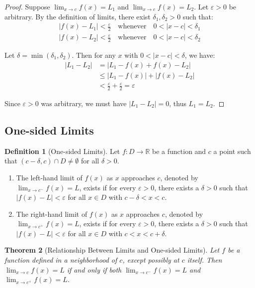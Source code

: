 \documentclass[12pt,a4paper]{article}
\theoremstyle{plain}
\newtheorem{theorem}{Theorem}[section]
\theoremstyle{definition}
\newtheorem{definition}[theorem]{Definition}
\begin{document}
\begin{proof}
Suppose $\lim_{x \to c} f(x) = L_1$ and $\lim_{x \to c} f(x) = L_2$. Let $\varepsilon > 0$ be arbitrary. By the definition of limits, there exist $\delta_1, \delta_2 > 0$ such that:
\begin{align*}
|f(x) - L_1| < \frac{\varepsilon}{2} \quad \text{whenever} \quad 0 < |x - c| < \delta_1 \\
|f(x) - L_2| < \frac{\varepsilon}{2} \quad \text{whenever} \quad 0 < |x - c| < \delta_2
\end{align*}

Let $\delta = \min(\delta_1, \delta_2)$. Then for any $x$ with $0 < |x - c| < \delta$, we have:
\begin{align*}
|L_1 - L_2| &= |L_1 - f(x) + f(x) - L_2| \\
&\leq |L_1 - f(x)| + |f(x) - L_2| \\
&< \frac{\varepsilon}{2} + \frac{\varepsilon}{2} = \varepsilon
\end{align*}

Since $\varepsilon > 0$ was arbitrary, we must have $|L_1 - L_2| = 0$, thus $L_1 = L_2$.
\end{proof}

\subsection{One-sided Limits}

\begin{definition}[One-sided Limits]
Let $f: D \to \mathbb{R}$ be a function and $c$ a point such that $(c - \delta, c) \cap D \neq \emptyset$ for all $\delta > 0$.
\begin{enumerate}[label=(\roman*)]
\item The left-hand limit of $f(x)$ as $x$ approaches $c$, denoted by $\lim_{x \to c^-} f(x) = L$, exists if for every $\varepsilon > 0$, there exists a $\delta > 0$ such that $|f(x) - L| < \varepsilon$ for all $x \in D$ with $c - \delta < x < c$.
\item The right-hand limit of $f(x)$ as $x$ approaches $c$, denoted by $\lim_{x \to c^+} f(x) = L$, exists if for every $\varepsilon > 0$, there exists a $\delta > 0$ such that $|f(x) - L| < \varepsilon$ for all $x \in D$ with $c < x < c + \delta$.
\end{enumerate}
\end{definition}

\begin{theorem}[Relationship Between Limits and One-sided Limits]
Let $f$ be a function defined in a neighborhood of $c$, except possibly at $c$ itself. Then $\lim_{x \to c} f(x) = L$ if and only if both $\lim_{x \to c^-} f(x) = L$ and $\lim_{x \to c^+} f(x) = L$.
\end{theorem}
\end{document}
